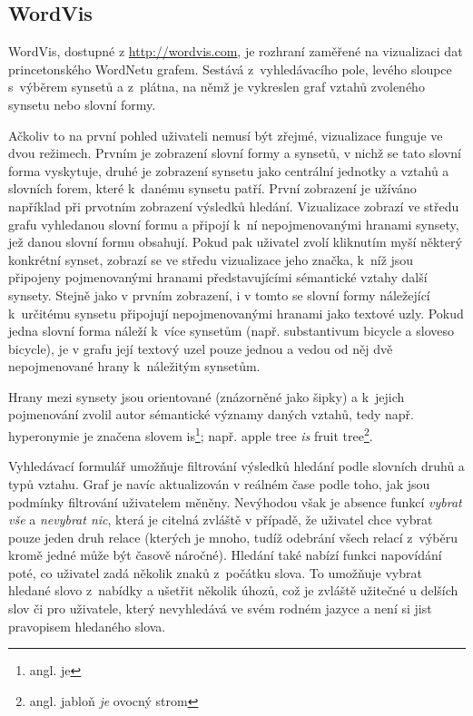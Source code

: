 \documentclass[a4paper, 11pt, oneside, showtrims]{book}
\newcommand\ex{\textsf}
\begin{document}
				\subsection{WordVis}
				\label{vis:wordvis}

					WordVis, dostupné z \url{http://wordvis.com}, je rozhraní zaměřené na vizualizaci dat princetonského WordNetu grafem. Sestává z~vyhledávacího pole, levého sloupce s~výběrem synsetů a z~plátna, na němž je vykreslen graf vztahů zvoleného synsetu nebo slovní formy. 

					Ačkoliv to na první pohled uživateli nemusí být zřejmé, vizualizace funguje ve dvou režimech. Prvním je zobrazení slovní formy a synsetů, v nichž se tato slovní forma vyskytuje, druhé je zobrazení synsetu jako centrální jednotky a vztahů a slovních forem, které k~danému synsetu patří. První zobrazení je užíváno například při prvotním zobrazení výsledků hledání. Vizualizace zobrazí ve středu grafu vyhledanou slovní formu a připojí k~ní nepojmenovanými hranami synsety, jež danou slovní formu obsahují. Pokud pak uživatel zvolí kliknutím myší některý konkrétní synset, zobrazí se ve středu vizualizace jeho značka, k~níž jsou připojeny pojmenovanými hranami představujícími sémantické vztahy další synsety. Stejně jako v prvním zobrazení, i v tomto se slovní formy náležející k~určitému synsetu připojují nepojmenovanými hranami jako textové uzly. Pokud jedna slovní forma náleží k~více synsetům (např. substantivum \ex{bicycle} a sloveso \ex{bicycle}), je v grafu její textový uzel pouze jednou a vedou od něj dvě nepojmenované hrany k~náležitým synsetům. 

					Hrany mezi synsety jsou orientované (znázorněné jako šipky) a k~jejich pojmenování zvolil autor sémantické významy daných vztahů, tedy např. hyperonymie je značena slovem \ex{is}\footnote{angl. \ex{je}}; např. \ex{apple tree \textit{is} fruit tree}\footnote{angl. \ex{jabloň \textit{je} ovocný strom}}.

					Vyhledávací formulář umožňuje filtrování výsledků hledání podle slovních druhů a typů vztahu. Graf je navíc aktualizován v reálném čase podle toho, jak jsou podmínky filtrování uživatelem měněny. Nevýhodou však je absence funkcí \textit{vybrat vše} a \textit{nevybrat nic}, která je citelná zvláště v případě, že uživatel chce vybrat pouze jeden druh relace (kterých je mnoho, tudíž odebrání všech relací z~výběru kromě jedné může být časově náročné). Hledání také nabízí funkci napovídání poté, co uživatel zadá několik znaků z~počátku slova. To umožňuje vybrat hledané slovo z~nabídky a ušetřit několik úhozů, což je zvláště užitečné u delších slov či pro uživatele, který nevyhledává ve svém rodném jazyce a není si jist pravopisem hledaného slova.
\end{document}
